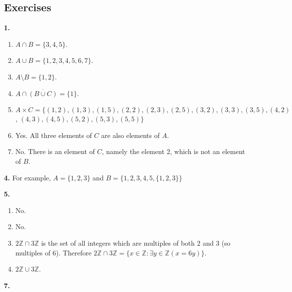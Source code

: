 \documentclass[12pt,]{book}
\theoremstyle{plain}
\theoremstyle{definition}
\theoremstyle{definition}
\theoremstyle{definition}
\numberwithin{equation}{chapter}
\newcommand{\Z}{\mathbb Z}
\newcommand{\st}{:}
\renewcommand{\bar}{\overline}
\begin{document}
\subsection*{ Exercises}
\noindent\textbf{1.} \hypertarget{p-660}{}%
\leavevmode%
\begin{enumerate}[label=(\alph*)]
\item\hypertarget{li-306}{}\(A \cap B = \{3,4,5\}\).%
\item\hypertarget{li-307}{}\(A \cup B = \{1,2,3,4,5,6,7\}\).%
\item\hypertarget{li-308}{}\(A \setminus B = \{1,2\}\).%
\item\hypertarget{li-309}{}\(A \cap \bar{(B \cup C)} = \{1\}\).%
\item\hypertarget{li-310}{}\(A \times C = \{ (1,2), (1,3), (1,5), (2,2), (2,3), (2,5), (3,2), (3,3), (3,5), (4,2)\), \((4,3), (4,5), (5,2), (5,3), (5,5)\}\)%
\item\hypertarget{li-311}{}\hypertarget{p-661}{}%
Yes.  All three elements of \(C\) are also elements of \(A\).%
\item\hypertarget{li-312}{}\hypertarget{p-662}{}%
No. There is an element of \(C\), namely the element 2, which is not an element of \(B\).%
\end{enumerate}
%
\par\smallskip
\noindent\textbf{4.} \hypertarget{p-671}{}%
For example, \(A = \{1,2,3\}\) and \(B = \{1,2,3,4,5,\{1,2,3\}\}\)%
\par\smallskip
\noindent\textbf{5.} \hypertarget{p-678}{}%
\leavevmode%
\begin{enumerate}[label=(\alph*)]
\item\hypertarget{li-321}{}\hypertarget{p-679}{}%
No.%
\item\hypertarget{li-322}{}\hypertarget{p-680}{}%
No.%
\item\hypertarget{li-323}{}\(2\Z \cap 3\Z\) is the set of all integers which are multiples of both 2 and 3 (so multiples of 6). Therefore \(2\Z \cap 3\Z = \{x \in \Z \st \exists y\in \Z(x = 6y)\}\).%
\item\hypertarget{li-324}{}\(2\Z \cup 3\Z\).%
\end{enumerate}
%
\par\smallskip
\noindent\textbf{7.} \hypertarget{p-683}{}%
\leavevmode%
\end{document}
